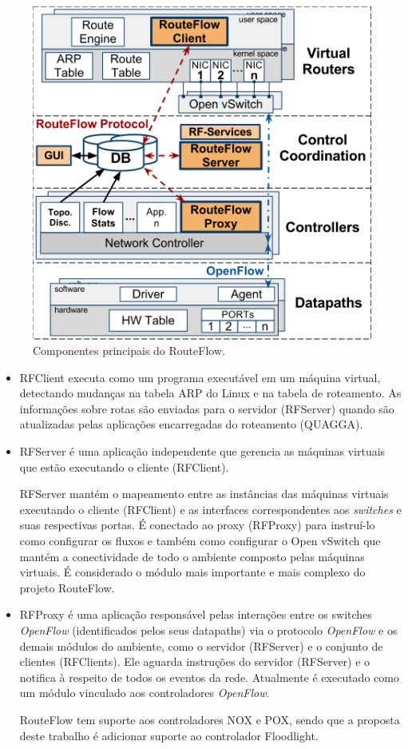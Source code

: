 \begin{figure}[h] 
\centering
\includegraphics[width=130mm]{componentesRouteFlow.png}
\caption{Componentes principais do RouteFlow.}
\label{fig:componentesRouteFlow} 
\end{figure}


\begin{itemize} 
\item RFClient executa como um programa
executável em um máquina virtual, detectando
mudanças na tabela ARP do Linux e na tabela de roteamento.
As informações sobre rotas são enviadas para o
servidor (RFServer) quando são atualizadas pelas aplicações
encarregadas do roteamento (QUAGGA). 

\item RFServer é uma aplicação independente que gerencia as
máquinas virtuais que estão executando o cliente (RFClient). 

RFServer mantém o mapeamento entre as instâncias das
máquinas virtuais executando o cliente (RFClient) e as interfaces
correspondentes aos \textit{switches} e suas respectivas portas. É
conectado ao proxy (RFProxy) para instruí-lo como configurar os
fluxos e também como configurar o Open vSwitch que mantém a
conectividade de todo o ambiente composto pelas máquinas virtuais.
É considerado o módulo mais importante e mais complexo
do projeto RouteFlow.

\item RFProxy é uma aplicação responsável pelas interações
entre os switches \textit{OpenFlow} (identificados pelos seus
datapaths) via o protocolo \textit{OpenFlow} e os demais
módulos do ambiente, como o servidor (RFServer) e o conjunto
de clientes (RFClients). Ele aguarda instruções
do servidor (RFServer) e o notifica à respeito de todos os eventos da rede.
Atualmente é executado como um módulo vinculado aos
controladores \textit{OpenFlow}. 

RouteFlow tem suporte aos
controladores NOX e POX, sendo que a proposta deste trabalho é
adicionar suporte ao controlador Floodlight. 
\end{itemize}

